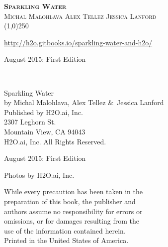 


%
%
\usepackage{tabularx}
\usepackage{booktabs}





\thispagestyle{empty} %

\begin{center}
\textsc{\Large\bf{Sparkling Water}}
\\
\bigskip
\textsc{\small{Michal Malohlava\hspace{40pt} Alex Tellez \hspace{40pt} Jessica Lanford}}
\\
\bigskip
\line(1,0){250}  %


{\url{http://h2o.gitbooks.io/sparkling-water-and-h2o/}}

\bigskip
August 2015: First Edition 
\\%
\bigskip
\end{center}

{\raggedright\vfill\ 

Sparkling Water\\
  by Michal Malohlava, Alex Tellez \&\ Jessica Lanford\\
\bigskip
  Published by H2O.ai, Inc. \\
2307 Leghorn St. \\
Mountain View, CA 94043\\
\bigskip
{} H2O.ai, Inc. All Rights Reserved. 
\bigskip

August 2015: First Edition
\bigskip

Photos by \textcopyright H2O.ai, Inc. 
\bigskip

While every precaution has been taken in the\\
preparation of this book, the publisher and\\
authors assume no responsibility for errors or\\
omissions, or for damages resulting from the\\
use of the information contained herein.\\
\bigskip
Printed in the United States of America. 


}\par

\newpage
\tableofcontents

\newpage

\newpage

